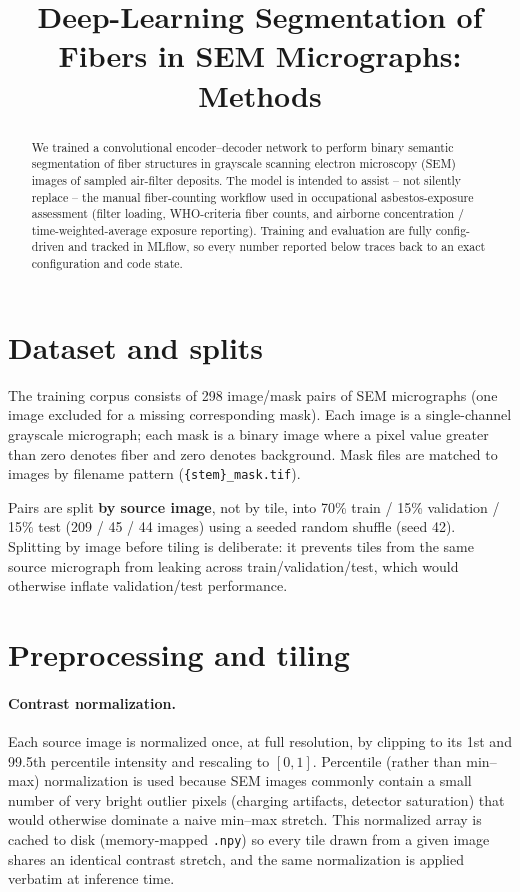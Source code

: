 \documentclass[11pt]{article}
\title{Deep-Learning Segmentation of Fibers in SEM Micrographs: Methods}
\author{}
\date{}
\begin{document}
\maketitle

\begin{abstract}
We trained a convolutional encoder--decoder network to perform binary semantic
segmentation of fiber structures in grayscale scanning electron microscopy
(SEM) images of sampled air-filter deposits. The model is intended to assist
-- not silently replace -- the manual fiber-counting workflow used in
occupational asbestos-exposure assessment (filter loading, WHO-criteria fiber
counts, and airborne concentration / time-weighted-average exposure
reporting). Training and evaluation are fully config-driven and tracked in
MLflow, so every number reported below traces back to an exact configuration
and code state.
\end{abstract}

\section{Dataset and splits}

The training corpus consists of 298 image/mask pairs of SEM micrographs (one
image excluded for a missing corresponding mask). Each image is a
single-channel grayscale micrograph; each mask is a binary image where a
pixel value greater than zero denotes fiber and zero denotes background. Mask
files are matched to images by filename pattern (\texttt{\{stem\}\_mask.tif}).

Pairs are split \textbf{by source image}, not by tile, into 70\% train / 15\%
validation / 15\% test (209 / 45 / 44 images) using a seeded random shuffle
(seed 42). Splitting by image before tiling is deliberate: it prevents tiles
from the same source micrograph from leaking across train/validation/test,
which would otherwise inflate validation/test performance.

\section{Preprocessing and tiling}

\paragraph{Contrast normalization.}
Each source image is normalized once, at full resolution, by clipping to its
1st and 99.5th percentile intensity and rescaling to $[0, 1]$. Percentile
(rather than min--max) normalization is used because SEM images commonly
contain a small number of very bright outlier pixels (charging artifacts,
detector saturation) that would otherwise dominate a naive min--max stretch.
This normalized array is cached to disk (memory-mapped \texttt{.npy}) so
every tile drawn from a given image shares an identical contrast stretch, and
the same normalization is applied verbatim at inference time.
\end{document}
